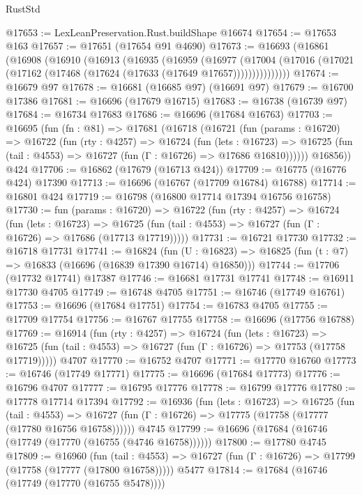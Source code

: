 \begin{lexlean}{RustStd}
\begin{coremodule}
@17653 := LexLeanPreservation.Rust.buildShape @16674
@17654 := @17653 @163
@17657 := @17651 (@17654 @91 @4690)
@17673 := @16693
    (@16861
      (@16908
        (@16910
          (@16913
            (@16935
              (@16959
                (@16977
                  (@17004
                    (@17016 (@17021 (@17162 (@17468 (@17624 (@17633 (@17649 @17657)))))))))))))))
@17674 := @16679 @97
@17678 := @16681 (@16685 @97) (@16691 @97)
@17679 := @16700 @17386
@17681 := @16696 (@17679 @16715)
@17683 := @16738 (@16739 @97)
@17684 := @16734 @17683
@17686 := @16696 (@17684 @16763)
@17703 := @16695
    (fun (fn : @81) =>
    @17681
      (@16718
        (@16721
          (fun (params : @16720) =>
          @16722
            (fun (rty : @4257) =>
            @16724
              (fun (lets : @16723) =>
              @16725 (fun (tail : @4553) => @16727 (fun (Γ : @16726) => @17686 @16810))))))
        @16856))
    @424
@17706 := @16862 (@17679 (@16713 @424))
@17709 := @16775 (@16776 @424) @17390
@17713 := @16696 (@16767 (@17709 @16784) @16788)
@17714 := @16801 @424
@17719 := @16798 (@16800 @17714 @17394 @16756 @16758)
@17730 := fun (params : @16720) =>
  @16722
    (fun (rty : @4257) =>
    @16724
      (fun (lets : @16723) =>
      @16725 (fun (tail : @4553) => @16727 (fun (Γ : @16726) => @17686 (@17713 @17719)))))
@17731 := @16721 @17730
@17732 := @16718 @17731
@17741 := @16824
    (fun (U : @16823) => @16825 (fun (t : @7) => @16833 (@16696 (@16839 @17390 @16714) @16850)))
@17744 := @17706 (@17732 @17741) @17387
@17746 := @16681 @17731 @17741
@17748 := @16911 @17730 @4705
@17749 := @16748 @4705
@17751 := @16746 (@17749 @16761)
@17753 := @16696 (@17684 @17751)
@17754 := @16783 @4705
@17755 := @17709 @17754
@17756 := @16767 @17755
@17758 := @16696 (@17756 @16788)
@17769 := @16914
    (fun (rty : @4257) =>
    @16724
      (fun (lets : @16723) =>
      @16725 (fun (tail : @4553) => @16727 (fun (Γ : @16726) => @17753 (@17758 @17719)))))
    @4707
@17770 := @16752 @4707
@17771 := @17770 @16760
@17773 := @16746 (@17749 @17771)
@17775 := @16696 (@17684 @17773)
@17776 := @16796 @4707
@17777 := @16795 @17776
@17778 := @16799 @17776
@17780 := @17778 @17714 @17394
@17792 := @16936
    (fun (lets : @16723) =>
    @16725
      (fun (tail : @4553) =>
      @16727 (fun (Γ : @16726) => @17775 (@17758 (@17777 (@17780 @16756 @16758))))))
    @4745
@17799 := @16696 (@17684 (@16746 (@17749 (@17770 (@16755 (@4746 @16758))))))
@17800 := @17780 @4745
@17809 := @16960
    (fun (tail : @4553) => @16727 (fun (Γ : @16726) => @17799 (@17758 (@17777 (@17800 @16758)))))
    @5477
@17814 := @17684 (@16746 (@17749 (@17770 (@16755 @5478))))

\end{coremodule}
\end{lexlean}
